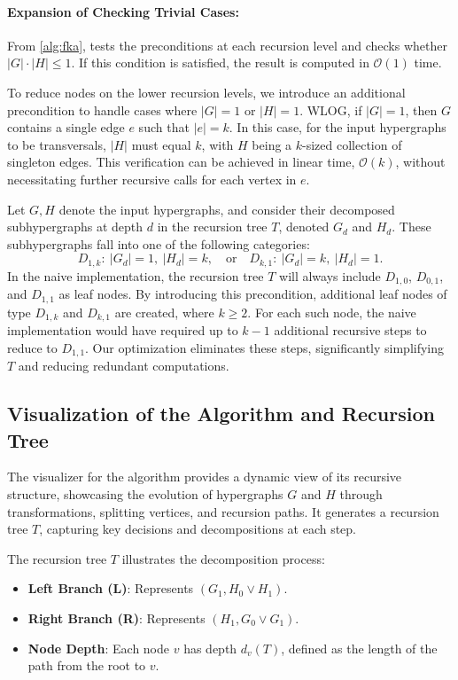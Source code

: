 \paragraph{Expansion of Checking Trivial Cases:} From \ref{alg:fka}, \FKA{} tests the preconditions at each recursion level and checks whether $|G|\cdot|H|\leq 1$. If this condition is satisfied, the result is computed in $\mathcal{O}(1)$ time.

To reduce nodes on the lower recursion levels, we introduce an additional precondition to handle cases where $|G|=1$ or $|H|=1$. WLOG, if $|G|=1$, then $G$ contains a single edge $e$ such that $|e|=k$. In this case, for the input hypergraphs to be transversals, $|H|$ must equal $k$, with $H$ being a $k$-sized collection of singleton edges. This verification can be achieved in linear time, $\mathcal{O}(k)$, without necessitating further recursive calls for each vertex in $e$.

Let $G,H$ denote the input hypergraphs, and consider their decomposed subhypergraphs at depth $d$ in the recursion tree $T$, denoted $G_d$ and $H_d$. These subhypergraphs fall into one of the following categories:
\[
D_{1,k}:\ |G_d|=1,\ |H_d|=k,\quad\text{or}\quad D_{k,1}:\ |G_d|=k,\ |H_d|=1.
\]
In the naive implementation, the recursion tree $T$ will always include $D_{1,0}$, $D_{0,1}$, and $D_{1,1}$ as leaf nodes. By introducing this precondition, additional leaf nodes of type $D_{1,k}$ and $D_{k,1}$ are created, where $k\geq 2$. For each such node, the naive implementation would have required up to $k-1$ additional recursive steps to reduce to $D_{1,1}$. Our optimization eliminates these steps, significantly simplifying $T$ and reducing redundant computations.

\subsection{Visualization of the\FKA{} Algorithm and Recursion Tree}

The visualizer for the\FKA{} algorithm provides a dynamic view of its recursive structure, showcasing the evolution of hypergraphs $G$ and $H$ through transformations, splitting vertices, and recursion paths. It generates a recursion tree $T$, capturing key decisions and decompositions at each step.

The recursion tree $T$ illustrates the decomposition process:
\begin{itemize}
\item \textbf{Left Branch (L)}: Represents $(G_1,H_0\vee H_1)$.
\item \textbf{Right Branch (R)}: Represents $(H_1,G_0\vee G_1)$.
\item \textbf{Node Depth}: Each node $v$ has depth $d_v(T)$, defined as the length of the path from the root to $v$.
\end{itemize}


